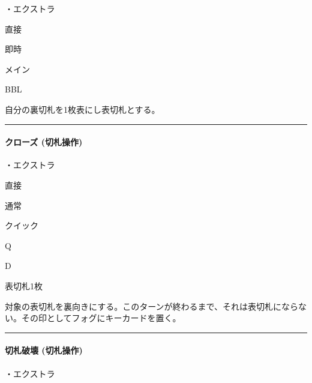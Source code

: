 \documentclass[letterpaper,10pt,dvipdfmx]{sphinxmanual}
\begin{document}
\sphinxAtStartPar
・エクストラ

\sphinxAtStartPar
{} 直接

\sphinxAtStartPar
{} 即時

\sphinxAtStartPar
{} メイン

\sphinxAtStartPar
{} BBL

\sphinxAtStartPar
{}

\sphinxAtStartPar
自分の裏切札を1枚表にし表切札とする。


\bigskip\hrule\bigskip



\paragraph{クローズ (切札操作)}
\label{\detokenize{auto/frameActionlist:act-close}}\label{\detokenize{auto/frameActionlist:id13}}
\sphinxAtStartPar
{}

\sphinxAtStartPar
・エクストラ

\sphinxAtStartPar
{} 直接

\sphinxAtStartPar
{} 通常

\sphinxAtStartPar
{} クイック

\sphinxAtStartPar
{} Q

\sphinxAtStartPar
{} D

\sphinxAtStartPar
{}

\sphinxAtStartPar
表切札1枚

\sphinxAtStartPar
{}

\sphinxAtStartPar
対象の表切札を裏向きにする。このターンが終わるまで、それは表切札にならない。その印としてフォグにキーカードを置く。


\bigskip\hrule\bigskip



\paragraph{切札破壊 (切札操作)}
\label{\detokenize{auto/frameActionlist:act-trumpdestroy}}\label{\detokenize{auto/frameActionlist:id14}}
\sphinxAtStartPar
{}

\sphinxAtStartPar
・エクストラ
\end{document}
